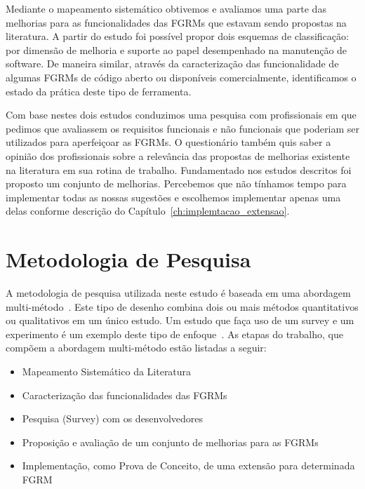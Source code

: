 Mediante o mapeamento sistemático obtivemos e avaliamos uma parte das melhorias
para as funcionalidades das FGRMs que estavam sendo propostas na literatura. A
partir do estudo foi possível propor dois esquemas de classificação: por
dimensão de melhoria e suporte ao papel desempenhado na manutenção de software.
De maneira similar, através da caracterização das funcionalidade de algumas
FGRMs de código aberto ou disponíveis comercialmente, identificamos o estado da
prática deste tipo de ferramenta.

Com base nestes dois estudos conduzimos uma pesquisa com profissionais em que
pedimos que avaliassem os requisitos funcionais e não funcionais que poderiam
ser utilizados para aperfeiçoar as FGRMs. O questionário também quis saber a
opinião dos profissionais sobre a relevância das propostas de me\-lho\-ri\-as
existente na literatura em sua rotina de trabalho. Fundamentado nos estudos
descritos foi proposto um conjunto de melhorias. Percebemos que não tínhamos
tempo para implementar todas as nossas sugestões e escolhemos implementar apenas
uma delas conforme descrição do Capítulo~\ref{ch:implemtacao_extensao}.

\section{Metodologia de Pesquisa}
\label{sec:intro-metodologia}


A metodologia de pesquisa utilizada neste estudo é baseada em uma abordagem
multi-método~\cite{hesse2010mixed}. Este tipo de desenho combina dois ou mais
métodos quantitativos ou qualitativos em um único estudo. Um estudo que faça uso
de um survey e um experimento é um exemplo deste tipo de
enfoque~\cite{hesse2010mixed}. As etapas do trabalho, que compõem a abordagem
multi-método estão listadas a seguir:

\begin{itemize}[(i)]
	\item Mapeamento Sistemático da Literatura~\cite{Petersen2008}
	\item Caracterização das funcionalidades das FGRMs
	\item Pesquisa (Survey) com os
		desenvolvedores~\cite{wohlin2012experimentation}
	\item Proposição e avaliação de um conjunto de melhorias para as FGRMs
    \item Implementação, como Prova de Conceito, de uma extensão para
        determinada FGRM
\end{itemize}

